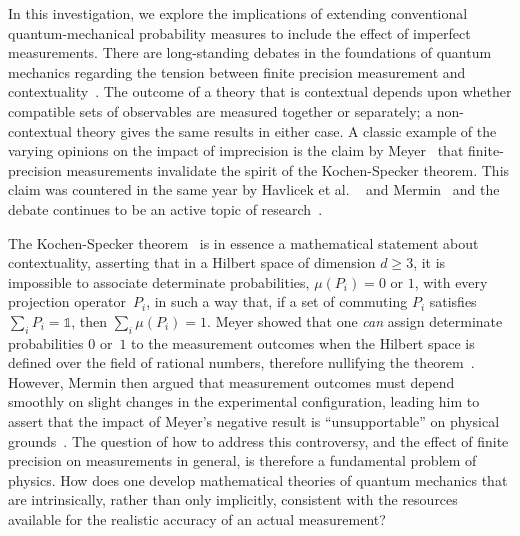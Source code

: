 \documentclass[english,reprint, aps, prl,superscriptaddress, showpacs,
showkeys, longbibliography, amsmath, amssymb, floatfix]{revtex4-1}
\theoremstyle{plain}
\theoremstyle{definition}
\begin{document}
In this investigation, we explore the implications of extending
conventional quantum-mechanical probability measures to include the
effect of imperfect measurements.  There are long-standing debates in
the foundations of quantum mechanics regarding the tension between
finite precision measurement and
contextuality~\cite{BarrettKent2004,Appleby_2005}. The outcome of a
theory that is contextual depends upon whether compatible sets of
observables are measured together or separately; a non-contextual
theory gives the same results in either case.  A classic example of
the varying opinions on the impact of imprecision is the claim by
Meyer~\cite{PhysRevLett.83.3751} that finite-precision measurements
invalidate the spirit of the Kochen-Specker theorem. This claim was
countered in the same year by Havlicek et al. ~\cite{HKSS1999apsrev4}
and Mermin~\cite{Mermin1999} and the debate continues to be an active
topic of
research~\cite{Kent1999,SimonBruknerZeilinger2001,Cabello2002,Larsson2002,Appleby2002,BarrettKent2004,Appleby_2005,Spekkens2005,GuehneKleinmannCabelloEtAl2010,MazurekPuseyKunjwalEtAl2016}.

The Kochen-Specker
theorem~\cite{BELL_1966,kochenspecker1967,Redhead1987-REDINA,Mermin1990Simple,peres1995quantum,Jaeger2007,Held2016}
is in essence a mathematical statement about contextuality, asserting
that in a Hilbert space of dimension $d \ge 3$, it is impossible to
associate determinate probabilities, $\mu(P_i)= 0$ or $1$, with every
projection operator~$P_i$, in such a way that, if a set of commuting
$P_i$ satisfies $\sum_i P_i = \mathbb{1}$, then $\sum_i \mu(P_i) = 1$.
Meyer showed that one {\it can\/} assign determinate probabilities $0$
or~$1$ to the measurement outcomes when the Hilbert space is defined
over the field of rational numbers, therefore nullifying the
theorem~\cite{PhysRevLett.83.3751}.  However, Mermin then argued that
measurement outcomes must depend smoothly on slight changes in the
experimental configuration, leading him to assert that the impact of
Meyer's negative result is ``unsupportable'' on physical
grounds~\cite{Mermin1999}.  The question of how to address this controversy, and the effect of 
finite precision on measurements in general, is therefore 
a fundamental problem of physics.  How does one
develop mathematical theories of quantum mechanics that are
intrinsically, rather than only implicitly, consistent with the
resources available for the realistic accuracy of an actual
measurement?   
\end{document}
